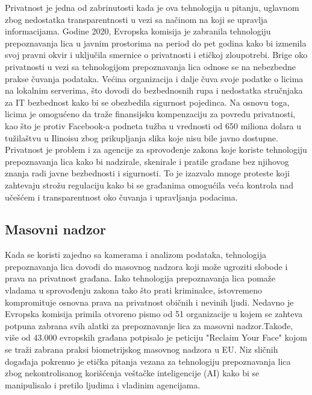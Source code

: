 \documentclass{article}
\begin{document}
Privatnost je jedna od zabrinutosti kada je ova tehnologija u pitanju, uglavnom zbog nedostatka transparentnosti u vezi sa načinom na koji se upravlja informacijama. 
\newline
\newline
Godine 2020, Evropska komisija je zabranila tehnologiju prepoznavanja lica u javnim prostorima na period do pet godina kako bi izmenila svoj pravni okvir i uključila smernice o privatnosti i etičkoj zloupotrebi.
\newline
\newline
Brige oko privatnosti u vezi sa tehnologijom prepoznavanja lica odnose se na nebezbedne prakse čuvanja podataka. Većina organizacija i dalje čuva svoje podatke o licima na lokalnim serverima, što dovodi do bezbednosnih rupa i nedostatka stručnjaka za IT bezbednost kako bi se obezbedila sigurnost pojedinca.
\newline
\newline
Na osnovu toga, licima je omogućeno da traže finansijsku kompenzaciju za povredu privatnosti, kao što je protiv Facebook-a podneta tužba u vrednosti od 650 miliona dolara u tužilaštvu u Ilinoisu zbog prikupljanja slika koje nisu bile javno dostupne. \cite{sedma}
\newline
\newline
Privatnost je problem i za agencije za sprovođenje zakona koje koriste tehnologiju prepoznavanja lica kako bi nadzirale, skenirale i pratile građane bez njihovog znanja radi javne bezbednosti i sigurnosti. To je izazvalo mnoge proteste koji zahtevaju strožu regulaciju kako bi se građanima omogućila veća kontrola nad učešćem i transparentnost oko čuvanja i upravljanja podacima.


\subsection{Masovni nadzor}

Kada se koristi zajedno sa kamerama i analizom podataka, tehnologija prepoznavanja lica dovodi do masovnog nadzora koji može ugroziti slobode i prava na privatnost građana. Iako tehnologija prepoznavanja lica pomaže vladama u sprovođenju zakona tako što prati kriminalce, istovremeno kompromituje osnovna prava na privatnost običnih i nevinih ljudi.
\newline
\newline
Nedavno je Evropska komisija primila otvoreno pismo od 51 organizacije u kojem se zahteva potpuna zabrana svih alatki za prepoznavanje lica za masovni nadzor.Takođe, više od 43.000 evropskih građana potpisalo je peticiju "Reclaim Your Face" kojom se traži zabrana praksi biometrijskog masovnog nadzora u EU. \cite{sedma}
\newline
\newline
Niz sličnih događaja pokrenuo je etička pitanja vezana za tehnologiju prepoznavanja lica zbog nekontrolisanog korišćenja veštačke inteligencije (AI) kako bi se manipulisalo i pretilo ljudima i vladinim agencijama.
\end{document}
